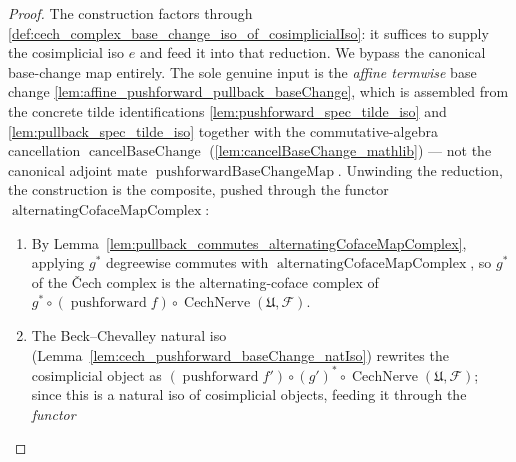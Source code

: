 \begin{proof}
  The construction factors through
  \cref{def:cech_complex_base_change_iso_of_cosimplicialIso}: it suffices to supply the
  cosimplicial iso \(e\) and feed it into that reduction. We bypass the canonical
  base-change map entirely. The sole genuine input is the \emph{affine termwise} base
  change \cref{lem:affine_pushforward_pullback_baseChange}, which is assembled from the
  concrete tilde identifications \cref{lem:pushforward_spec_tilde_iso} and
  \cref{lem:pullback_spec_tilde_iso} together with the commutative-algebra cancellation
  \(\operatorname{cancelBaseChange}\) (\cref{lem:cancelBaseChange_mathlib}) --- not the
  canonical adjoint mate \(\operatorname{pushforwardBaseChangeMap}\). Unwinding the
  reduction, the construction is the composite,
  pushed through the functor \(\operatorname{alternatingCofaceMapComplex}\):
  \begin{enumerate}
    \item By Lemma~\ref{lem:pullback_commutes_alternatingCofaceMapComplex}, applying
      \(g^*\) degreewise commutes with \(\operatorname{alternatingCofaceMapComplex}\),
      so \(g^*\) of the {\v C}ech complex is the alternating-coface complex of
      \(g^* \circ (\operatorname{pushforward} f) \circ
      \operatorname{CechNerve}(\mathfrak{U}, \mathcal{F})\).
    \item The Beck--Chevalley natural iso
      (Lemma~\ref{lem:cech_pushforward_baseChange_natIso}) rewrites the cosimplicial
      object as \((\operatorname{pushforward} f') \circ (g')^* \circ
      \operatorname{CechNerve}(\mathfrak{U}, \mathcal{F})\); since this is a natural iso
      of cosimplicial objects, feeding it through the \emph{functor}

\end{enumerate}
\end{proof}
